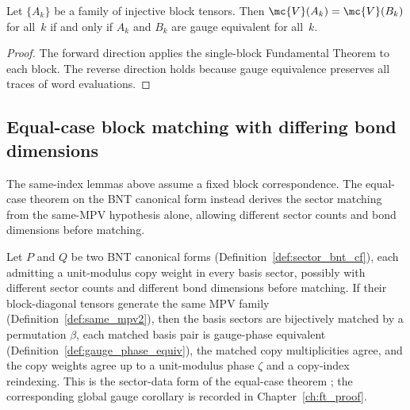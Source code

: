 \begin{lemma}%
    \label{lem:perBlock_sameMPV_iff_gaugeEquiv}
    \leanok
    Let $\{A_k\}$ be a family of injective block tensors.
    Then $\mc{V}(A_k) = \mc{V}(B_k)$ for all~$k$ if and only if
    $A_k$ and $B_k$ are gauge equivalent for all~$k$.
\end{lemma}

\begin{proof}\leanok{}
    The forward direction applies the single-block Fundamental Theorem to
    each block.
    The reverse direction holds because gauge equivalence preserves all
    traces of word evaluations.
\end{proof}

\subsection{Equal-case block matching with differing bond dimensions}%
\label{sec:different_bond_dimension_equal_case_ft}

The same-index lemmas above assume a fixed block correspondence. The
equal-case theorem on the BNT canonical form instead derives the
sector matching from the same-MPV hypothesis alone, allowing different
sector counts and bond dimensions before matching.

\begin{lemma}%
    \label{lem:ft_sector_bnt_equal_sector_data_different_dims}
    \leanok
    Let $P$ and $Q$ be two BNT canonical forms
    (Definition~\ref{def:sector_bnt_cf}), each admitting a unit-modulus copy
    weight in every basis sector, possibly with different sector counts and
    different bond dimensions before matching.
    If their block-diagonal tensors generate the same MPV family
    (Definition~\ref{def:same_mpv2}), then the basis sectors are
    bijectively matched by a permutation $\beta$, each matched basis pair is
    gauge-phase equivalent (Definition~\ref{def:gauge_phase_equiv}), the
    matched copy multiplicities agree, and the copy weights agree up to a
    unit-modulus phase $\zeta$ and a copy-index reindexing.
    This is the sector-data form of the equal-case theorem
    \cite[Corollary~2.11, lines 354--361 and appendix 1172--1192]{Cirac2016MPDO_arXiv};
    the corresponding global gauge corollary is recorded in
    Chapter~\ref{ch:ft_proof}.
\end{lemma}

